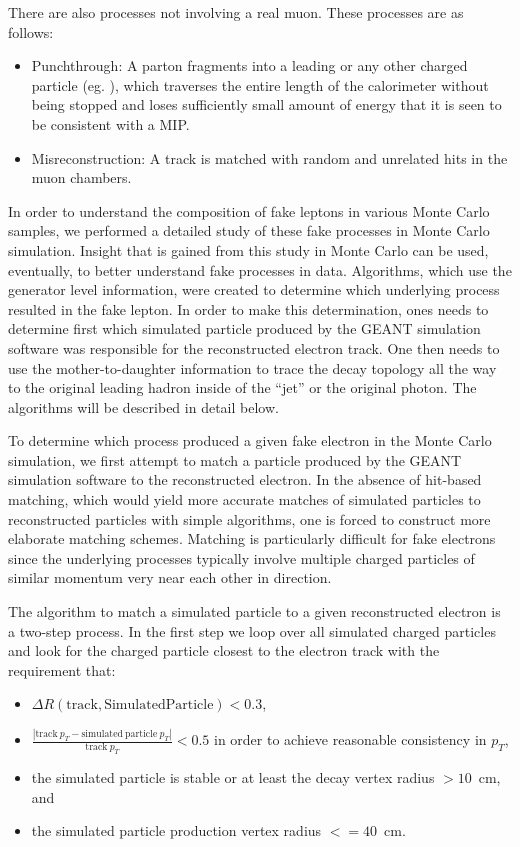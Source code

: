 \documentclass{cmspaper}
\begin{document}
There are also processes not involving a real muon. These processes are as follows:
\begin{itemize}
\item Punchthrough: A parton fragments into a leading \pipm or any other charged particle (eg. \Kpm), which traverses the entire length of the calorimeter without being stopped and loses sufficiently small amount of energy that it is seen to be consistent with a MIP. 
\item Misreconstruction: A track is matched with random and unrelated hits in the muon chambers. 
\end{itemize}



\label{sec:categorization_algorithm}
In order to understand the composition of fake leptons in various Monte Carlo samples, we performed a detailed study of these fake processes in Monte Carlo simulation. Insight that is gained from this study in Monte Carlo can be used, eventually, to better understand fake processes in data. Algorithms, which use the generator level information, were created to determine which underlying process resulted in the fake lepton. In order to make this determination, ones needs to determine first which simulated particle produced by the GEANT simulation software was responsible for the reconstructed electron track. One then needs to use the mother-to-daughter information to trace the decay topology all the way to the original leading hadron inside of the ``jet'' or the original photon. The algorithms will be described in detail below.
 
To determine which process produced a given fake electron in the Monte Carlo simulation, we first attempt to match a particle produced by the GEANT simulation software to the reconstructed electron. In the absence of hit-based matching, which would yield more accurate matches of simulated particles to reconstructed particles with simple algorithms, one is forced to construct more elaborate matching schemes. Matching is particularly difficult for fake electrons since the underlying processes typically involve multiple charged particles of similar momentum very near each other in direction.

The algorithm to match a simulated particle to a given reconstructed electron is a two-step process. In the first step we loop over all simulated charged particles and look for the charged particle closest to the electron track with the requirement that: 
\begin{itemize}
\item $\Delta R(\mathrm{ track , Simulated Particle }) < 0.3$, 
\item $\frac{|\mathrm{track}\ p_T - \mathrm{simulated\ particle}\ p_T|}{\mathrm{track}\ p_T} < 0.5$ in order to achieve reasonable consistency in $p_T$, 
\item the simulated particle is stable or at least the decay vertex radius $ > 10$~cm, and
\item the simulated particle production vertex radius $ <= 40$~cm. 
\end{itemize}
\end{document}
